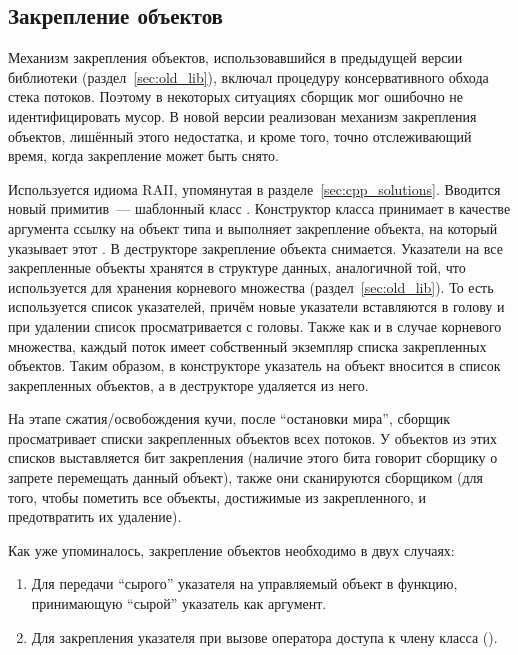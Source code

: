 \subsection{Закрепление объектов}
Механизм закрепления объектов, использовавшийся в предыдущей версии библиотеки 
(раздел~\ref{sec:old_lib}), включал процедуру консервативного обхода стека потоков. 
Поэтому в некоторых ситуациях сборщик мог ошибочно не идентифицировать мусор. 
В новой версии реализован механизм закрепления объектов, лишённый этого недостатка, и 
кроме того, точно отслеживающий время, когда закрепление может быть снято.

Используется идиома RAII, упомянутая в разделе~\ref{sec:cpp_solutions}. 
Вводится новый примитив~--- шаблонный класс . 
Конструктор класса  принимает в качестве аргумента ссылку на объект типа 
 и выполняет закрепление объекта, на который указывает этот . 
В деструкторе  закрепление объекта снимается. 
Указатели на все закрепленные объекты хранятся в структуре данных, аналогичной той, 
что используется для хранения корневого множества (раздел~\ref{sec:old_lib}). 
То есть используется список указателей, причём новые указатели вставляются в голову и 
при удалении список просматривается с головы. 
Также как и в случае корневого множества, каждый поток имеет собственный экземпляр списка 
закрепленных объектов. 
Таким образом, в конструкторе  указатель на объект вносится в список 
закрепленных объектов, а в деструкторе удаляется из него.

На этапе сжатия/освобождения кучи, после ``остановки мира'', сборщик просматривает списки 
закрепленных объектов всех потоков. 
У объектов из этих списков выставляется бит закрепления (наличие этого бита говорит сборщику 
о запрете перемещать данный объект), также они сканируются сборщиком (для того, чтобы 
пометить все объекты, достижимые из закрепленного, и предотвратить их удаление). 

Как уже упоминалось, закрепление объектов необходимо в двух случаях:
\begin{enumerate}
\item 
    Для передачи ``сырого'' указателя на управляемый объект в функцию, принимающую ``сырой'' 
    указатель как аргумент.
\item 
    Для закрепления указателя  при вызове оператора доступа к члену класса 
    ().
\end{enumerate}

